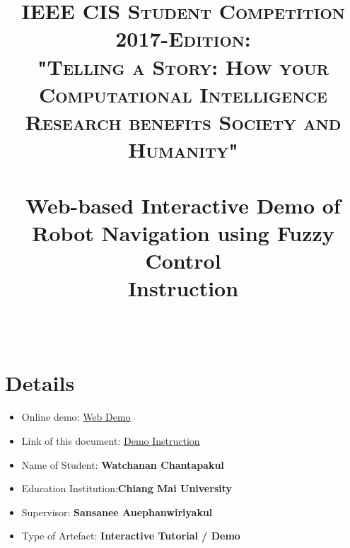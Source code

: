 \documentclass[paper=a4, fontsize=11pt]{scrartcl}
\title{
	\usefont{OT1}{bch}{b}{n}
	\normalfont \normalsize \textsc{IEEE CIS Student Competition 2017-Edition: \\ "Telling a Story: How your Computational Intelligence Research benefits Society and Humanity"} \\ [25pt]
	\horrule{0.5pt} \\[0.4cm]
	\huge Web-based Interactive Demo of Robot Navigation using Fuzzy Control 
	\\\textbf{Instruction}
	\\
	\horrule{2pt} \\[0cm]
}
\date{}
\numberwithin{equation}{section}		%
\numberwithin{figure}{section}			%
\numberwithin{table}{section}				%
\begin{document}
	\maketitle
	
	\section{Details}
	
	\begin{itemize}
		\item Online demo: \href{https://tmwatchanan.github.io/fuzzy-robot-navigation/index.html}{Web Demo}
		\item Link of this document: \href{https://github.com/tmwatchanan/fuzzy-robot-navigation/raw/master/documents/Web-based%20Interactive%20Demo%20of%20Robot%20Navigation%20using%20Fuzzy%20Control.pdf}{Demo Instruction}
		\item Name of Student: \textbf{Watchanan Chantapakul}
		\item Education Institution:\textbf{Chiang Mai University}
		\item Supervisor: \textbf{Sansanee Auephanwiriyakul}
		\item Type of Artefact: \textbf{Interactive Tutorial / Demo}
	\end{itemize}
	
	
	
\end{document}

